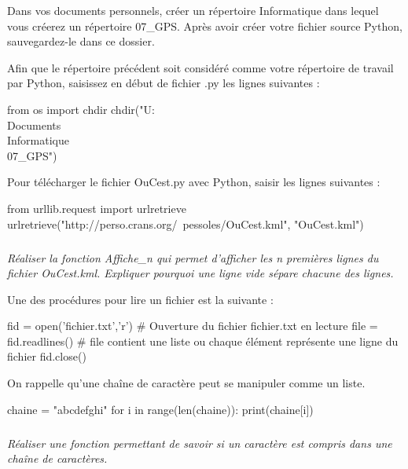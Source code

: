 \documentclass[10pt,oneside]{article}
\begin{document}
\begin{py}
Dans vos documents personnels, créer un répertoire \textsf{Informatique} dans lequel vous créerez un répertoire \textsf{07\_GPS}. Après avoir créer votre fichier source Python, sauvegardez-le dans ce dossier. 

Afin que le répertoire précédent soit considéré comme votre répertoire de travail par Python, saisissez en début de fichier .py les lignes suivantes :

\begin{python}
from os import chdir
chdir("U:\\Documents\\Informatique\\07_GPS")
\end{python}

Pour télécharger le fichier \textsf{OuCest.py} avec Python, saisir les lignes suivantes :

\begin{python}
from urllib.request import urlretrieve
urlretrieve("http://perso.crans.org/~pessoles/OuCest.kml", "OuCest.kml")
\end{python}

\end{py}



\subparagraph{}
\textit{Réaliser la fonction \textsf{Affiche\_n} qui permet d'afficher les n premières lignes du fichier \textsf{OuCest.kml}. Expliquer pourquoi une ligne vide sépare chacune des lignes.}

\begin{py}
Une des procédures pour lire un fichier est la suivante :
\begin{python}
fid = open('fichier.txt','r') # Ouverture du fichier fichier.txt en lecture
file = fid.readlines()        # file contient une liste ou chaque élément représente une ligne du fichier
fid.close()
\end{python}

On rappelle qu'une chaîne de caractère peut se manipuler comme un liste. 
\begin{python}
chaine = "abcdefghi"
for i in range(len(chaine)):
    print(chaine[i])
\end{python}

\end{py}


\subparagraph{}
\textit{Réaliser une fonction permettant de savoir si un caractère est compris dans une chaîne de caractères.}
\end{document}
